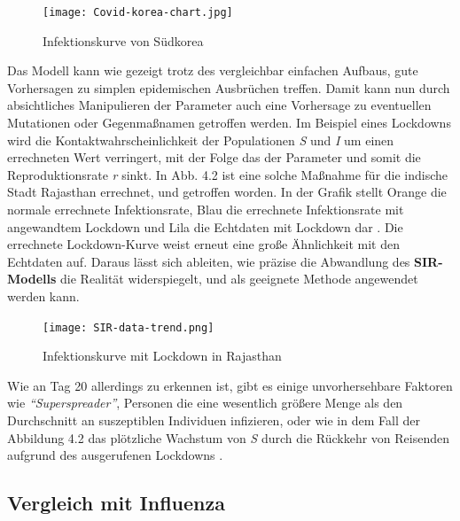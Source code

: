 \documentclass[12pt]{scrartcl} %
\begin{document}
	\begin{figure}[h]
	\centering
	\texttt{[image: Covid-korea-chart.jpg]}
	\caption[Infektionskurve von Südkorea,\newline https://cmte.ieee.org/futuredirections/tech-policy-ethics/may-2020/covid-19-disease-modelling-and-its-impact-on-public-health-policy/]{Infektionskurve von Südkorea}
	\end{figure}
	
Das Modell kann wie gezeigt trotz des vergleichbar einfachen Aufbaus, gute Vorhersagen zu simplen epidemischen Ausbrüchen treffen.
Damit kann nun durch absichtliches Manipulieren der Parameter auch eine Vorhersage zu eventuellen Mutationen oder Gegenmaßnamen getroffen werden. Im Beispiel eines Lockdowns wird die Kontaktwahrscheinlichkeit der Populationen \textit{S} und \textit{I} um einen errechneten Wert verringert, mit der Folge das der Parameter \textbeta\space und somit die Reproduktionsrate \textit{r} sinkt. In Abb. 4.2 ist eine solche Maßnahme für die indische Stadt Rajasthan errechnet, und getroffen worden. In der Grafik stellt Orange die normale errechnete Infektionsrate, Blau die errechnete Infektionsrate mit angewandtem Lockdown und Lila die Echtdaten mit Lockdown dar \cite{3, 10, 11}. Die errechnete Lockdown-Kurve weist erneut eine große Ähnlichkeit mit den Echtdaten auf.
Daraus lässt sich ableiten, wie präzise die Abwandlung des \textbf{SIR-Modells} die Realität widerspiegelt, und als geeignete Methode angewendet werden kann.
	
	\begin{figure}[h]
	\centering
	\texttt{[image: SIR-data-trend.png]}
	\caption[Infektionskurve mit Lockdown in Rajasthan,\newline Entnommen aus: \cite{3}]{Infektionskurve mit Lockdown in Rajasthan}
	\end{figure}
	
Wie an Tag 20 allerdings zu erkennen ist, gibt es einige unvorhersehbare Faktoren wie \textsl{"`Superspreader"'}, Personen die eine wesentlich größere Menge als den Durchschnitt an suszeptiblen Individuen infizieren, oder wie in dem Fall der Abbildung 4.2 das plötzliche Wachstum von \textsl{S} durch die Rückkehr von Reisenden aufgrund des ausgerufenen Lockdowns \cite{3, 11}.

\newpage
\subsection{Vergleich mit Influenza}
\end{document}
